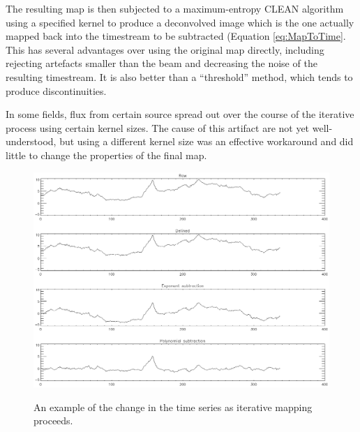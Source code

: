 \documentclass[12pt,preprint]{aastex}
\begin{document}
The resulting map is then subjected to a maximum-entropy CLEAN algorithm
using a specified kernel to produce a deconvolved image
which is the one actually mapped back into the timestream to be
subtracted (Equation \ref{eq:MapToTime}.  This has several advantages
over using the original map directly, including rejecting artefacts
smaller than the beam and decreasing the noise of the resulting
timestream.  It is also better than a ``threshold'' method, which
tends to produce discontinuities.

In some fields, flux from certain source spread out over the course of
the iterative process using certain kernel sizes.  The cause of this
artifact are not yet well-understood, but using a different kernel
size was an effective workaround and did little to change the
properties of the final map.

\setcounter{subfig}{1}
\renewcommand{\thefigure}{\arabic{figure}\alph{subfig}}

\begin{figure}
  \begin{minipage}{6.5in}
    \begin{center}
      \includegraphics[scale=0.9]{iterative_mapping1}
      \caption{An example of the change in the time series as
      iterative mapping proceeds.}
    \end{center}
    \label{fig:IterativeMapping}
  \end{minipage}
\end{figure}

\addtocounter{figure}{-1}
\addtocounter{subfig}{1}
\end{document}
